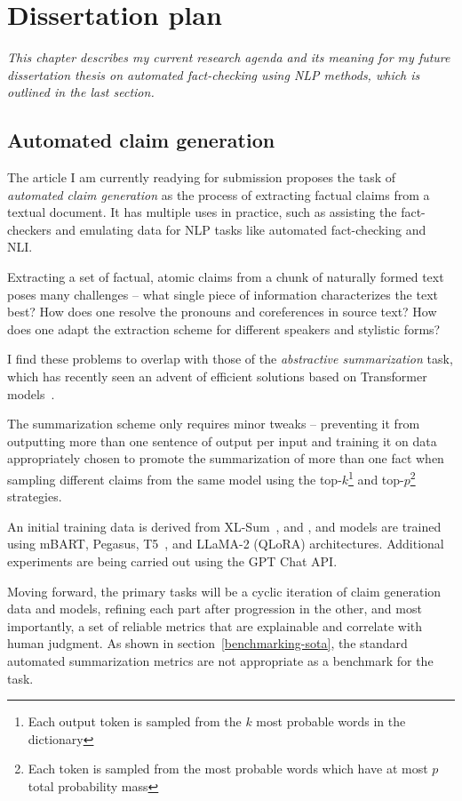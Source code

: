 
\chapter{Dissertation plan}
\label{chap:plan}
\textit{This chapter describes my current research agenda and its meaning for my future dissertation thesis on automated fact-checking using NLP methods, which is outlined in the last section.}

\section{Automated claim generation}
\label{generation}

The article I am currently readying for submission proposes the task of \textit{automated claim generation} as the process of extracting factual claims from a textual document. It has multiple uses in practice, such as assisting the fact-checkers and emulating data for NLP tasks like automated fact-checking and NLI.

Extracting a set of factual, atomic claims from a chunk of naturally formed text poses many challenges -- what single piece of information characterizes the text best? 
How does one resolve the pronouns and coreferences in source text?
How does one adapt the extraction scheme for different speakers and stylistic forms?

I find these problems to overlap with those of the \textit{abstractive summarization} task, which has recently seen an advent of efficient solutions based on Transformer models~\cite{pegasus, brio}.

The summarization scheme only requires minor tweaks -- preventing it from outputting more than one sentence of output per input and training it on data appropriately chosen to promote the summarization of more than one fact when sampling different claims from the same model using the top-$k$\footnote{Each output token is sampled from the $k$ most probable words in the dictionary} and top-$p$\footnote{Each token is sampled from the most probable words which have at most $p$ total probability mass}~\cite{topp} strategies.

An initial training data is derived from XL-Sum~\cite{xlsum}, \FEN and \CTK, and models are trained using mBART, Pegasus, T5~\cite{t5-11b}, and LLaMA-2 (QLoRA) architectures.  Additional experiments are being carried out using the GPT Chat API.

Moving forward, the primary tasks will be a cyclic iteration of claim generation data and models, refining each part after progression in the other, and most importantly, a set of reliable metrics that are explainable and correlate with human judgment.
As shown in section~\ref{benchmarking-sota}, the standard automated summarization metrics are not appropriate as a benchmark for the task.

